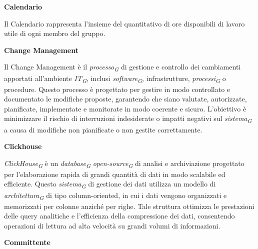 \documentclass{article}
\begin{document}
\vspace{0.4cm}

\textbf{Calendario}

\vspace{0.1cm}

Il Calendario rappresenta l’insieme del quantitativo di ore disponibili di lavoro utile di ogni membro del gruppo.

\vspace{0.4cm}

\textbf{Change Management}

\vspace{0.1cm}

Il Change Management è il \textit{processo}\textsubscript{\textit{G}} di gestione e controllo dei cambiamenti apportati all'ambiente \textit{IT}\textsubscript{\textit{G}}, inclusi \textit{software}\textsubscript{\textit{G}}, infrastrutture, \textit{processi}\textsubscript{\textit{G}} o procedure. Questo processo è progettato per gestire in modo controllato e documentato le modifiche proposte, garantendo che siano valutate, autorizzate, pianificate, implementate e monitorate in modo coerente e sicuro. L'obiettivo è minimizzare il rischio di interruzioni indesiderate o impatti negativi sul \textit{sistema}\textsubscript{\textit{G}} a causa di modifiche non pianificate o non gestite correttamente.

\vspace{0.4cm}

\textbf{Clickhouse}

\vspace{0.1cm}

\textit{ClickHouse}\textsubscript{\textit{G}} è un \textit{database}\textsubscript{\textit{G}} \textit{open-source}\textsubscript{\textit{G}} di analisi e archiviazione progettato per l'elaborazione rapida di grandi quantità di dati in modo scalabile ed efficiente. Questo \textit{sistema}\textsubscript{\textit{G}} di gestione dei dati utilizza un modello di \textit{architettura}\textsubscript{\textit{G}} di tipo column-oriented, in cui i dati vengono organizzati e memorizzati per colonne anziché per righe. Tale struttura ottimizza le prestazioni delle query analitiche e l'efficienza della compressione dei dati, consentendo operazioni di lettura ad alta velocità su grandi volumi di informazioni. 

\vspace{0.4cm}

\textbf{Committente}

\vspace{0.1cm}
\end{document}
